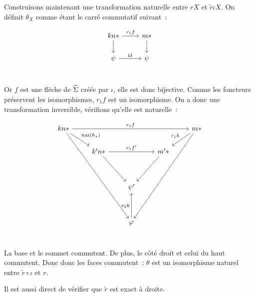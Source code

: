\begin{pv}
    Construisons maintenant une transformation naturelle entre $rX$ et
    $\tilde{r}\iota X$. On définit $\theta_X$ comme étant le carré commutatif
    suivant~:

    \[\begin{tikzcd}
        kn\ast\arrow[r, "r_1f"]\arrow[d] & m\ast\arrow[d] \\
        \psi\arrow[r, "\id"] & \psi \\
    \end{tikzcd}\]

    Or $f$ est une flèche de $\widetilde{\Sigma}$ créée par $\iota$, elle est donc bijective. Comme
    les foncteurs préservent les isomorphismes, $r_1f$ est un isomorphisme. On a donc
    une transformation inversible, vérifions qu'elle est naturelle~:

    \[\begin{tikzcd}
        kn\ast\arrow[rrrr, "r_1f"]\arrow[dr, "n\arf(h_\star)"]\arrow[dddddrr]
            & & & & m\ast\arrow[dl, swap, "r_1h"]\arrow[dddddll] \\
        & k'n\ast\arrow[rr, "r_1f'"]\arrow[ddr]
            & & m'\ast\arrow[ddl] & \\
        & & & & \\
        & & \psi' & & \\
        & & & & \\
        & & \phi\arrow[uu, "r_2h"] & & \\
    \end{tikzcd}\]

    La base et le sommet commutent. De plus, le côté droit et celui du haut commutent.
    Donc donc les faces commutent~: $\theta$ est un isomorphisme naturel entre
    $\tilde{r}\circ\iota$ et $r$.

    Il est aussi direct de vérifier que $\tilde{r}$ est exact à droite.
\end{pv}


